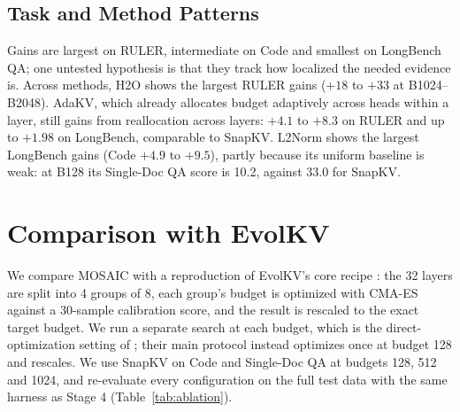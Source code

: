 \documentclass[11pt]{article}
\begin{document}
\subsection{Task and Method Patterns}

Gains are largest on RULER, intermediate on Code and smallest on LongBench QA; one untested hypothesis is that they track how localized the needed evidence is. Across methods, H2O shows the largest RULER gains ($+18$ to $+33$ at B1024--B2048). AdaKV, which already allocates budget adaptively across heads within a layer, still gains from reallocation across layers: $+4.1$ to $+8.3$ on RULER and up to $+1.98$ on LongBench, comparable to SnapKV. L2Norm shows the largest LongBench gains (Code $+4.9$ to $+9.5$), partly because its uniform baseline is weak: at B128 its Single-Doc QA score is 10.2, against 33.0 for SnapKV.

\section{Comparison with EvolKV}

We compare MOSAIC with a reproduction of EvolKV's core recipe \citep{yu2025evolkv}: the 32 layers are split into 4 groups of 8, each group's budget is optimized with CMA-ES against a 30-sample calibration score, and the result is rescaled to the exact target budget. We run a separate search at each budget, which is the direct-optimization setting of \citet{yu2025evolkv}; their main protocol instead optimizes once at budget 128 and rescales. We use SnapKV on Code and Single-Doc QA at budgets 128, 512 and 1024, and re-evaluate every configuration on the full test data with the same harness as Stage 4 (Table~\ref{tab:ablation}).
\end{document}

